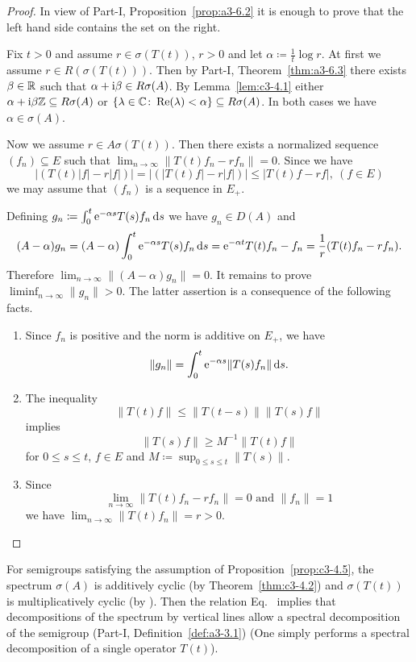 \begin{proof}
In view of Part-I, Proposition~\ref{prop:a3-6.2} it is enough to prove that the left hand
side contains the set on the right.

Fix $t > 0$ and assume $r \in \sigma(T(t))$, $r > 0$ and let $\alpha \coloneq \frac{1}{t} \log r$.
At first we assume $r \in R(\sigma(T(t)))$.
Then by Part-I, Theorem~\ref{thm:a3-6.3} there exists
$\beta \in \mathbb{R} $ such that $\alpha+\mathrm{i}\beta \in R\sigma(A)$.
By Lemma~\ref{lem:c3-4.1} either $\alpha+\mathrm{i}\beta\mathbb{Z} \subseteq R\sigma(A)$
or $\{\lambda \in \mathbb{C}  \colon \mathop{}\!\mathrm{Re}(\lambda) < \alpha\} \subseteq R\sigma(A)$.
In both cases we have $\alpha \in \sigma(A)$.

Now we assume $r \in A\sigma(T(t))$. 
Then there exists a normalized sequence
$(f_n) \subseteq E$ such that $\lim_{n \to \infty}\|T(t)f_n - rf_n\| = 0$.
Since we have
\[
|(T(t)|f| - r|f|)| = |(|T(t)f| - r|f|)| \leq |T(t)f - rf|, \  (f \in E) 
\]
we may assume that $(f_n)$ is a sequence in $E_+$.

Defining $g_n \coloneq \int_{0}^{t} \mathrm{e}^{-\alpha s}T(s)f_n \mathop{}\!\mathrm{d}{s} $ we have $g_n \in D(A)$ and
\[
(A-\alpha)g_n = (A-\alpha)\int_{0}^{t} \mathrm{e}^{-\alpha s}T(s)f_n \mathop{}\!\mathrm{d}{s} = \mathrm{e}^{-\alpha t}T(t)f_n - f_n = \frac{1}{r}(T(t)f_n - rf_n) .
\]
Therefore $\lim_{n \to \infty}\|(A - \alpha) g_n\| = 0$.  It remains to prove 
$\liminf_{n \to \infty}\|g_n\| > 0$. 
The latter assertion is a consequence of the following facts.
\begin{enumerate}[\upshape (i),wide, labelindent=.25em]

\item
Since $f_n$ is positive and the norm is additive on $E_+$,
we have
\[
    \|g_n\| = \int_{0}^{t} \mathrm{e}^{-\alpha s}\|T(s)f_n\| \mathop{}\!\mathrm{d}{s} .
\]

\item 
The inequality 
\[
    \|T(t)f\| \leq \|T(t-s)\|\|T(s)f\|
\]
implies
\[
    	\|T(s)f\| \geq M^{-1}\|T(t)f\|
\]
for  $0 \leq s \leq t$, $f \in E$ and $ M \coloneq \sup_{ 0 \leq s \leq t} \|T(s)\|$.
    
    
\item 
Since 
\[
\lim_{n \to \infty} \|T(t)f_{n} - rf_{n}\| = 0 \text{ and $\|f_n\| = 1$}
\]
we have
$\lim_{n \to \infty}\|T(t)f_n\| = r > 0$.
\qedhere
\end{enumerate}
\end{proof}
For semigroups satisfying the assumption of Proposition~\ref{prop:c3-4.5}, the spectrum $\sigma(A)$ is additively cyclic (by Theorem~\ref{thm:c3-4.2}) and $\sigma(T(t))$ is multiplicatively cyclic
(by \textcite[V.Theorem~4.4]{schaefer:1974}). 
Then the relation Eq.~ implies that
decompositions of the spectrum by vertical lines allow a spectral decomposition%
 of the semigroup (\cf Part-I, Definition~\ref{def:a3-3.1}) (One simply performs a spectral decomposition of a single operator $T(t)$). 

